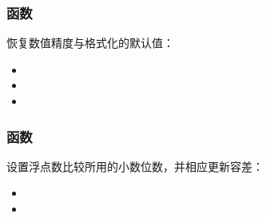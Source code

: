\subsubsection{函数 }
\label{ssub:tkz_reset_defaults}

恢复数值精度与格式化的默认值：
\begin{itemize}
  \item {}
  \item {}
  \item {}
\end{itemize}


\subsubsection{函数 }
\label{ssub:tkz_set_nb_dec}


设置浮点数比较所用的小数位数，并相应更新容差：
\begin{itemize}
  \item {}
  \item {}
\end{itemize}
\endinput
